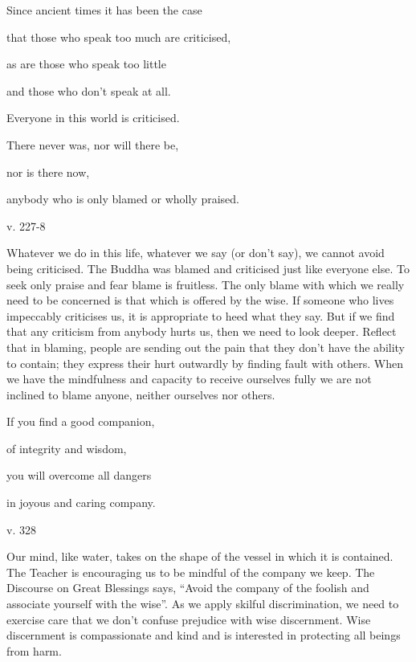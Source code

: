 \documentclass[a4paper,portrait,12pt]{article}
\begin{document}
Since ancient times it has been the case 


that those who speak too much are criticised, 


as are those who speak too little 


and those who don't speak at all. 


Everyone in this world is criticised. 


There never was, nor will there be,


nor is there now,


anybody who is only blamed or wholly praised.





v. 227-8





Whatever we do in this life, whatever we say (or don't say), we cannot avoid being criticised. The Buddha was blamed and criticised just like everyone else. To seek only praise and fear blame is fruitless. The only blame with which we really need to be concerned is that which is offered by the wise. If someone who lives impeccably criticises us, it is appropriate to heed what they say. But if we find that any criticism from anybody hurts us, then we need to look deeper. Reflect that in blaming, people are sending out the pain that they don't have the ability to contain; they express their hurt outwardly by finding fault with others. When we have the mindfulness and capacity to receive ourselves fully we are not inclined to blame anyone, neither ourselves nor others.














If you find a good companion,


of integrity and wisdom,


you will overcome all dangers


in joyous and caring company.





v. 328





Our mind, like water, takes on the shape of the vessel in which it is contained. The Teacher is encouraging us to be mindful of the company we keep. The Discourse on Great Blessings says, ``Avoid the company of the foolish and associate yourself with the wise''. As we apply skilful discrimination, we need to exercise care that we don't confuse prejudice with wise discernment. Wise discernment is compassionate and kind and is interested in protecting all beings from harm.
\end{document}
